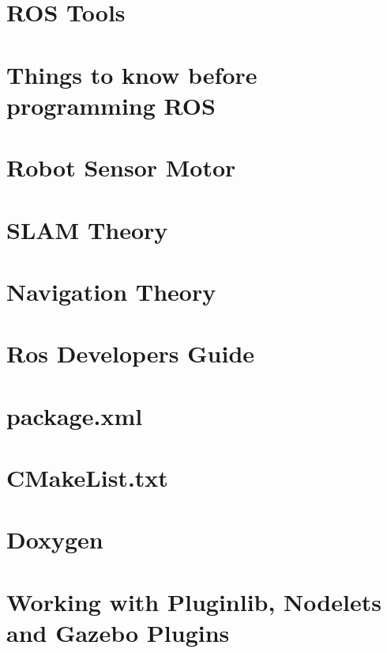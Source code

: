 \documentclass[11pt]{report}
\begin{document}
\chapter{ROS Tools}


\chapter{Things to know before programming ROS}


\chapter{Robot Sensor Motor}


\chapter{SLAM Theory}


\chapter{Navigation Theory}


\chapter{Ros Developers Guide}


\chapter{package.xml}


\chapter{CMakeList.txt}


\chapter{Doxygen}


\chapter{Working with Pluginlib, Nodelets and Gazebo Plugins}

\end{document}
